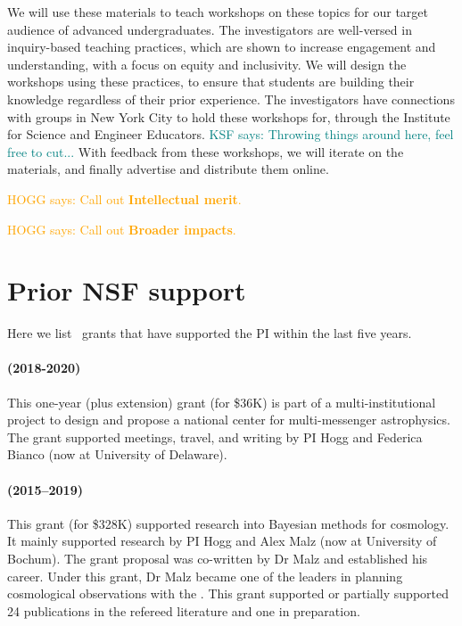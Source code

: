 \documentclass[12pt, fullpage, letterpaper]{article}
\newcommand{\KSF}[1]{\textcolor{teal}{KSF says: #1}}
\newcommand{\HOGG}[1]{\textcolor{orange}{HOGG says: #1}}
\begin{document}
We will use these materials to teach workshops on these topics for our target audience of advanced undergraduates.
The investigators are well-versed in inquiry-based teaching practices, which are shown to increase engagement and understanding, with a focus on equity and inclusivity.
We will design the workshops using these practices, to ensure that students are building their knowledge regardless of their prior experience.
The investigators have connections with groups in New York City to hold these workshops for, through the Institute for Science and Engineer Educators. \KSF{Throwing things around here, feel free to cut...}
With feedback from these workshops, we will iterate on the materials, and finally advertise and distribute them online. 

\HOGG{Call out \textbf{Intellectual merit}.}

\HOGG{Call out \textbf{Broader impacts}.}

\section{Prior NSF support}

Here we list \NSF\ grants that have supported the PI within the last five years.

\paragraph{
 (2018-2020)}
This one-year (plus extension) grant (for \$36K) is part of a multi-institutional project
to design and propose a national center for multi-messenger astrophysics. The grant supported
meetings, travel, and writing by PI Hogg and Federica Bianco (now at University of Delaware).

\paragraph{
(2015--2019)} This grant (for \$328K) supported research into Bayesian
methods for cosmology. It mainly supported research by PI Hogg and
Alex Malz (now at University of Bochum). The grant proposal was co-written
by Dr Malz and established his career.
Under this grant, Dr Malz became one of the leaders in planning cosmological
observations with the .
This grant supported or partially supported 24 publications
in the refereed literature and one in preparation.
\end{document}
